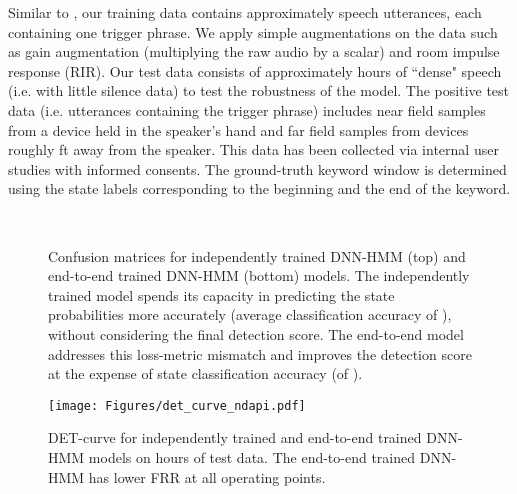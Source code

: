 \documentclass{article}
\begin{document}
Similar to \cite{Higuchi2020}, our training data contains approximately  speech utterances, each containing one trigger phrase.
We apply simple augmentations on the data such as gain augmentation (multiplying the raw audio by a scalar) and room impulse response (RIR).
Our test data consists of approximately  hours of ``dense" speech (i.e. with little silence data) to test the robustness of the model.
The positive test data (i.e. utterances containing the trigger phrase) includes near field samples from a device held in the speaker's hand and far field samples from devices roughly ft away from the speaker.
This data has been collected via internal user studies with informed consents.
The ground-truth keyword window is determined using the state labels corresponding to the beginning and the end of the keyword.

\begin{figure}[h!]
  \centering
{}
\\
\vspace{-0.1in}
\vspace{-0.1in}
\caption{Confusion matrices for independently trained DNN-HMM (top) and end-to-end trained DNN-HMM (bottom) models.
The independently trained model spends its capacity in predicting the state probabilities more accurately (average classification accuracy of ), without considering the final detection score.
The end-to-end model addresses this loss-metric mismatch and improves the detection score at the expense of state classification accuracy (of ).
\vspace{-0.2in}}
\label{fig:conf_mtx}
\end{figure}

\begin{figure}[]
    \centering
    \texttt{[image: Figures/det\_curve\_ndapi.pdf]} \\
    \vspace{-0.1in}
    \caption{DET-curve for independently trained and end-to-end trained DNN-HMM models on  hours of test data.
    The end-to-end trained DNN-HMM has lower FRR at all operating points.
    \vspace{-0.1in}}
    \label{fig:det-curve}
\end{figure}
\end{document}
